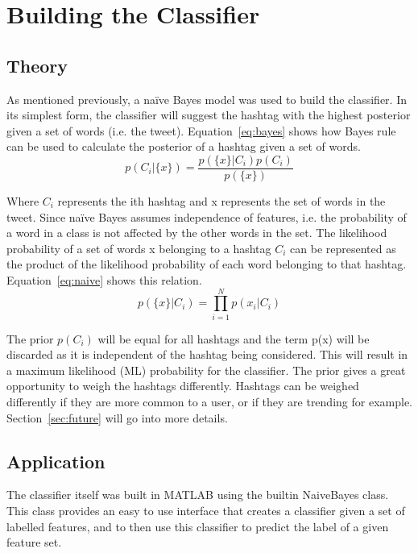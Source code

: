 \documentclass[conference]{IEEEtran}
\begin{document}
\section{Building the Classifier}
\subsection{Theory}
As mentioned previously, a na\"{i}ve Bayes model was used to build the classifier. In its simplest form, the classifier will suggest the hashtag with the highest posterior given a set of words (i.e. the tweet). Equation~\ref{eq:bayes} shows how Bayes rule can be used to calculate the posterior of a hashtag given a set of words.
\begin{equation} \label{eq:bayes}
  p(C_i|\{x\}) = \frac{p(\{x\}|C_i)p(C_i)}{p(\{x\})}
\end{equation}

Where $C_i$ represents the ith hashtag and {x} represents the set of words in the tweet. Since na\"{i}ve Bayes assumes independence of features, i.e. the probability of a word in a class is not affected by the other words in the set. The likelihood probability of a set of words {x} belonging to a hashtag $C_i$ can be represented as the product of the likelihood probability of each word belonging to that hashtag. Equation~\ref{eq:naive} shows this relation.
\begin{equation} \label{eq:naive}
  p(\{x\}|C_i) = \prod_{i=1}^Np(x_i|C_i)
\end{equation}

The prior $p(C_i)$ will be equal for all hashtags and the term p({x}) will be discarded as it is independent of the hashtag being considered. This will result in a maximum likelihood (ML) probability for the classifier. The prior gives a great opportunity to weigh the hashtags differently. Hashtags can be weighed differently if they are more common to a user, or if they are trending for example. Section~\ref{sec:future} will go into more details.

\subsection{Application}

The classifier itself was built in MATLAB using the builtin NaiveBayes class. This class provides an easy to use interface that creates a classifier given a set of labelled features, and to then use this classifier to predict the label of a given feature set.
\end{document}
